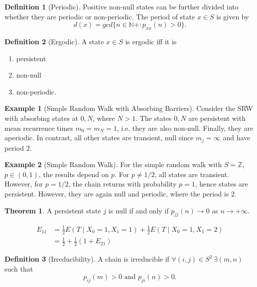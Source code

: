 \documentclass{article}
\theoremstyle{definition}
\newtheorem{exmp}{Example}[section]
\newtheorem{defn}{Definition}[section]
\newtheorem{theorem}{Theorem}[section]
\begin{document}
\begin{defn}[Periodic]
Positive non-null states can be further divided into whether they are periodic or non-periodic.
The period of state $x \in S$ is given by
$$
d(x)= gcd \{n \in \mathbb{N}+: p_{xx}(n)>0 \}.
$$
\end{defn}

\begin{defn}[Ergodic]
A state $x \in S$ is ergodic iff it is
\begin{enumerate}
\item persistent
\item non-null
\item non-periodic.
\end{enumerate}
\end{defn}

\begin{exmp}[Simple Random Walk with Absorbing Barriers]
Consider the SRW with absorbing states at $0, N$, where $N > 1$. The states $0,N$ are persistent with mean recurrence times $m_0 = m_N = 1$, i.e. they are also non-null. Finally, they are aperiodic. In contrast, all other states are transient, null since $m_j = \infty$ and have period $2$.
\end{exmp}

\begin{exmp}[Simple Random Walk]
For the simple random walk with $S = \mathbb{Z}$, $p \in (0,1)$, the results depend on $p$. For $p \ne 1/2$, all states are transient. However, for $p=1/2$, the chain returns with probability $p=1$, hence states are persistent. However, they are again null and periodic, where the period is $2$.
\end{exmp}

\begin{theorem}
A persistent state $j$ is null if and only if $p_{jj}(n) \to 0$ as $n \to +\infty$.
\end{theorem}

\begin{align*}
E_{11}
&= \frac{1}{2} E(T \mid X_0 = 1, X_1 = 1) + \frac{1}{2}  E(T \mid X_0 = 1, X_1 = 2) \\
&= \frac{1}{2} + \frac{1}{2} ( 1 + E_{21} )
\end{align*}

\begin{defn}[Irreducibility]
A chain is irreducible if $
\forall (i,j) \in S^2 \, \exists (m,n)$ such that
$$
p_{ij}(m) > 0 \text{ and } p_{ji}(n) > 0.
$$
\end{defn}
\end{document}
